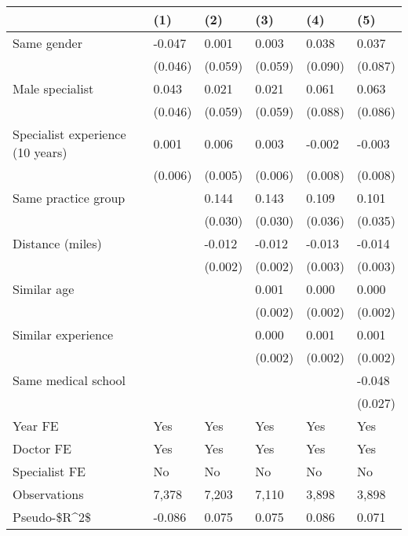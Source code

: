 \begin{tabular}{llllll}
\hline
& (1) & (2) & (3) & (4) & (5) \\ \hline
Same gender                        & -0.047  & 0.001   & 0.003   & 0.038   & 0.037   \\
& (0.046) & (0.059) & (0.059) & (0.090) & (0.087) \\
Male specialist                    & 0.043   & 0.021   & 0.021   & 0.061   & 0.063   \\
& (0.046) & (0.059) & (0.059) & (0.088) & (0.086) \\
Specialist experience (10 years)   & 0.001   & 0.006   & 0.003   & -0.002  & -0.003  \\
& (0.006) & (0.005) & (0.006) & (0.008) & (0.008) \\
Same practice group                &         & 0.144   & 0.143   & 0.109   & 0.101   \\
&         & (0.030) & (0.030) & (0.036) & (0.035) \\
Distance (miles)                   &         & -0.012  & -0.012  & -0.013  & -0.014  \\
&         & (0.002) & (0.002) & (0.003) & (0.003) \\
Similar age                        &         &         & 0.001   & 0.000   & 0.000   \\
&         &         & (0.002) & (0.002) & (0.002) \\
Similar experience                 &         &         & 0.000   & 0.001   & 0.001   \\
&         &         & (0.002) & (0.002) & (0.002) \\
Same medical school                &         &         &         &         & -0.048  \\
&         &         &         &         & (0.027) \\
Year FE                            & Yes     & Yes     & Yes     & Yes     & Yes     \\
Doctor FE                          & Yes     & Yes     & Yes     & Yes     & Yes     \\
Specialist FE                      & No      & No      & No      & No      & No      \\
Observations                       & 7,378   & 7,203   & 7,110   & 3,898   & 3,898   \\
Pseudo-\$R\textasciicircum{}2\$ & -0.086  & 0.075   & 0.075   & 0.086   & 0.071   \\
\hline
\end{tabular}
